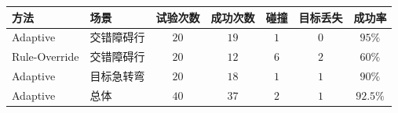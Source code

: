 \begin{tabular*}{\columnwidth}{@{\extracolsep{\fill}}llccccc@{}}
\toprule
方法 & 场景 & 试验次数 & 成功次数 & 碰撞 & 目标丢失 & 成功率 \\
\midrule
Adaptive & 交错障碍行 & $20$ & $19$ & $1$ & $0$ & $95\%$ \\
Rule-Override & 交错障碍行 & $20$ & $12$ & $6$ & $2$ & $60\%$ \\
Adaptive & 目标急转弯 & $20$ & $18$ & $1$ & $1$ & $90\%$ \\
Adaptive & 总体 & $40$ & $37$ & $2$ & $1$ & $92.5\%$ \\
\bottomrule
\end{tabular*}

